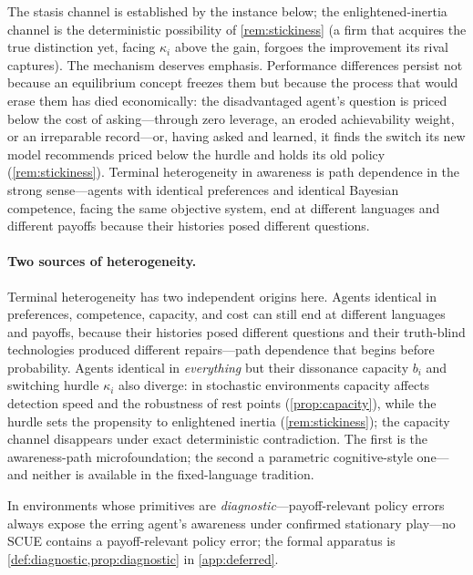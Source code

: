 \documentclass[11pt]{article}
\theoremstyle{definition}
\begin{document}
The stasis channel is established by the instance below; the enlightened-inertia channel is the deterministic possibility of \cref{rem:stickiness} (a firm that acquires the true distinction yet, facing $\kappa_i$ above the gain, forgoes the improvement its rival captures). The mechanism deserves emphasis.
Performance differences persist not because an equilibrium concept freezes them but because the process that would erase them has died economically: the disadvantaged agent's question is priced below the cost of asking---through zero leverage, an eroded achievability weight, or an irreparable record---or, having asked and learned, it finds the switch its new model recommends priced below the hurdle and holds its old policy (\cref{rem:stickiness}).
Terminal heterogeneity in awareness is path dependence in the strong sense---agents with identical preferences and identical Bayesian competence, facing the same objective system, end at different languages and different payoffs because their histories posed different questions.

\paragraph{Two sources of heterogeneity.}
\label{rem:two-sources}
Terminal heterogeneity has two independent origins here.
Agents identical in preferences, competence, capacity, and cost can still end at different languages and payoffs, because their histories posed different questions and their truth-blind technologies produced different repairs---path dependence that begins before probability.
Agents identical in \emph{everything} but their dissonance capacity $b_i$ and switching hurdle $\kappa_i$ also diverge: in stochastic environments capacity affects detection speed and the robustness of rest points (\cref{prop:capacity}), while the hurdle sets the propensity to enlightened inertia (\cref{rem:stickiness}); the capacity channel disappears under exact deterministic contradiction.
The first is the awareness-path microfoundation; the second a parametric cognitive-style one---and neither is available in the fixed-language tradition.

In environments whose primitives are \emph{diagnostic}---payoff-relevant policy errors always expose the erring agent's awareness under confirmed stationary play---no SCUE contains a payoff-relevant policy error; the formal apparatus is \cref{def:diagnostic,prop:diagnostic} in \cref{app:deferred}.
\end{document}
